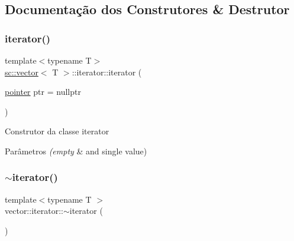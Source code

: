\subsection{Documentação dos Construtores \& Destrutor}
\mbox{\label{classsc_1_1vector_1_1iterator_a98c81d1f7e22a53be1a4d571f312a765}} 
\subsubsection{\texorpdfstring{iterator()}{iterator()}\hspace{0.1cm}{\footnotesize\ttfamily [1/2]}}
{\footnotesize\ttfamily template$<$typename T$>$ \\
\mbox{\hyperlink{classsc_1_1vector}{sc\+::vector}}$<$ T $>$\+::iterator\+::iterator (\begin{DoxyParamCaption}\item[{\mbox{\hyperlink{classsc_1_1vector_1_1iterator_a518f02aadbb3fd937bdbda24120d2678}{pointer}}}]{ptr = {\ttfamily nullptr} }\end{DoxyParamCaption})\hspace{0.3cm}{\ttfamily [inline]}}

Construtor da classe iterator 
\begin{DoxyParams}{Parâmetros}
{\em (empty} & and single value) \\
\hline
\end{DoxyParams}
\mbox{\label{classsc_1_1vector_1_1iterator_ade6d4199568c72dc21820a63dd3e19f8}} 
\subsubsection{\texorpdfstring{$\sim$iterator()}{~iterator()}}
{\footnotesize\ttfamily template$<$typename T $>$ \\
vector\+::iterator\+::$\sim$iterator (\begin{DoxyParamCaption}{ }\end{DoxyParamCaption})\hspace{0.3cm}{\ttfamily [default]}}

